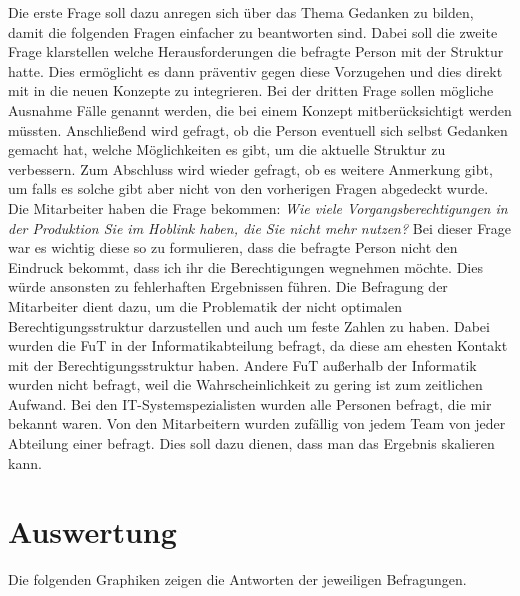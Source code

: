 Die erste Frage soll dazu anregen sich über das Thema Gedanken zu bilden, damit die folgenden Fragen einfacher zu beantworten sind.
Dabei soll die zweite Frage klarstellen welche Herausforderungen die befragte Person mit der Struktur hatte.
Dies ermöglicht es dann präventiv gegen diese Vorzugehen und dies direkt mit in die neuen Konzepte zu integrieren.
Bei der dritten Frage sollen mögliche Ausnahme Fälle genannt werden, die bei einem Konzept mitberücksichtigt werden müssten.
Anschließend wird gefragt, ob die Person eventuell sich selbst Gedanken gemacht hat, welche Möglichkeiten es gibt, um die aktuelle Struktur zu verbessern.
Zum Abschluss wird wieder gefragt, ob es weitere Anmerkung gibt, um falls es solche gibt aber nicht von den vorherigen Fragen abgedeckt wurde.
\newline
\newline
Die Mitarbeiter haben die Frage bekommen:
\newline
\newline
\textit{Wie viele Vorgangsberechtigungen in der Produktion Sie im Hoblink haben, die Sie nicht mehr nutzen?}
\newline
\newline
Bei dieser Frage war es wichtig diese so zu formulieren, dass die befragte Person nicht den Eindruck bekommt, dass ich ihr die Berechtigungen wegnehmen möchte.
Dies würde ansonsten zu fehlerhaften Ergebnissen führen.
Die Befragung der Mitarbeiter dient dazu, um die Problematik der nicht optimalen Berechtigungsstruktur darzustellen und auch um feste Zahlen zu haben.
\newline
\newline
Dabei wurden die \ac{FuT} in der Informatikabteilung befragt, da diese am ehesten Kontakt mit der Berechtigungsstruktur haben.
Andere \ac{FuT} außerhalb der Informatik wurden nicht befragt, weil die Wahrscheinlichkeit zu gering ist zum zeitlichen Aufwand.
Bei den IT-Systemspezialisten wurden alle Personen befragt, die mir bekannt waren.
Von den Mitarbeitern wurden zufällig von jedem Team von jeder Abteilung einer befragt.
Dies soll dazu dienen, dass man das Ergebnis skalieren kann.
\newpage
\section{Auswertung}
\label{sec:Auswertung}

Die folgenden Graphiken zeigen die Antworten der jeweiligen Befragungen.

